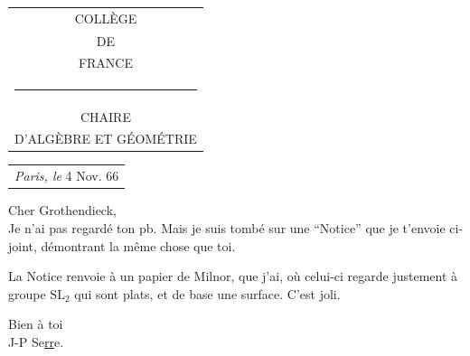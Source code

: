 \noindent\begin{tabular}[t]{c}
COLLÈGE\\
DE\\
FRANCE\\
\rule{1.8em}{0.5pt}\\
CHAIRE\\
D’ALGÈBRE ET GÉOMÉTRIE
\end{tabular}\hfill
\begin{tabular}[t]{l}
\textit{Paris, le} 4 Nov. 66\\
\end{tabular}

Cher Grothendieck,\\

Je n’ai pas regardé ton pb. Mais je suis tombé sur une ``Notice'' que je t’envoie ci-joint, démontrant la même chose que toi.

La Notice renvoie à un papier de Milnor, que j’ai, où celui-ci regarde justement  à groupe $\mathrm{SL}_{2}$ qui sont plats, et de base une surface. C’est  joli.

Bien à toi\\
J-P Se\uline{rr}e.\\
\clearpage
